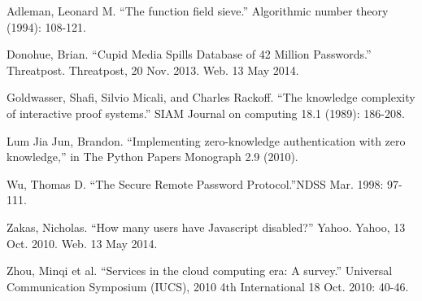 \documentclass[11pt]{article}
\begin{document}
\begin{thebibliography}{9}
Adleman, Leonard M. ``The function field sieve.'' Algorithmic number theory (1994): 108-121.

Donohue, Brian. ``Cupid Media Spills Database of 42 Million Passwords.'' Threatpost. Threatpost, 20 Nov. 2013. Web. 13 May 2014.

Goldwasser, Shafi, Silvio Micali, and Charles Rackoff. ``The knowledge complexity of interactive proof systems.'' SIAM Journal on computing 18.1 (1989): 186-208.

Lum Jia Jun, Brandon. ``Implementing zero-knowledge authentication with zero knowledge,'' in The Python Papers Monograph 2.9 (2010).

Wu, Thomas D. ``The Secure Remote Password Protocol.''NDSS Mar. 1998: 97-111.

Zakas, Nicholas. ``How many users have Javascript disabled?'' Yahoo. Yahoo, 13 Oct. 2010. Web. 13 May 2014.

Zhou, Minqi et al. ``Services in the cloud computing era: A survey.'' Universal Communication Symposium (IUCS), 2010 4th International 18 Oct. 2010: 40-46.

\end{thebibliography}
\end{document}
